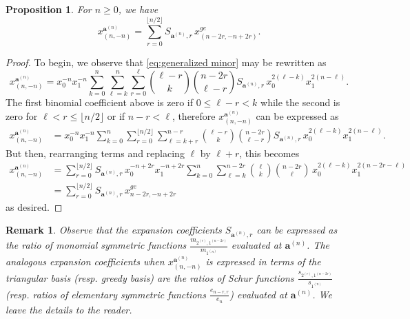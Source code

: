 \documentclass[pdflatex,sn-mathphys]{sn-jnl}%
\theoremstyle{thmstyleone}%
\newtheorem{proposition}[theorem]{Proposition}
\theoremstyle{thmstyletwo}%
\newtheorem{remark}[theorem]{Remark}%
\theoremstyle{thmstylethree}%
\newcommand{\bfa}{\boldsymbol{a}}
\begin{document}
  \begin{proposition}
    \label{prop:rewrite}
    For $n\ge0$, we have
    \[
      x_{(n,-n)}^{\bfa^{(n)}}
      =
      \sum_{r=0}^{\lfloor n/2 \rfloor}
      S_{\bfa^{(n)},r}
      \,
      x_{(n-2r,-n+2r)}^{ge}.
    \]
  \end{proposition}
  \begin{proof}
    To begin, we observe that \eqref{eq:generalized minor} may be rewritten as
    \[
      x_{(n,-n)}^{\bfa^{(n)}} = x_0^{-n} x_1^{-n} \sum_{k=0}^n \sum_{\ell=k}^n \sum_{r=0}^\ell {\ell-r\choose k} {n-2r\choose \ell-r} S_{\bfa^{(n)},r}  \, x_0^{2(\ell-k)} x_1^{2(n-\ell)}.
    \]
    The first binomial coefficient above is zero if $0 \le \ell-r < k$ while the second is zero for $\ell < r \le \lfloor n/2\rfloor$ or if $n-r < \ell$, therefore $x_{(n,-n)}^{\bfa^{(n)}}$ can be expressed as
    \begin{align*}
      x_{(n,-n)}^{\bfa^{(n)}}
      &=
      x_0^{-n} x_1^{-n} \sum_{k=0}^n \sum_{r=0}^{\lfloor n/2\rfloor} \sum_{\ell=k+r}^{n-r} {\ell-r\choose k} {n-2r\choose \ell-r} S_{\bfa^{(n)},r}  \, x_0^{2(\ell-k)} x_1^{2(n-\ell)}.
    \end{align*}
    But then, rearranging terms and replacing $\ell$ by $\ell+r$, this becomes
    \begin{align*}
      x_{(n,-n)}^{\bfa^{(n)}}
      &=
      \sum_{r=0}^{\lfloor n/2\rfloor} S_{\bfa^{(n)},r}\, x_0^{-n+2r} x_1^{-n+2r} \sum_{k=0}^n \sum_{\ell=k}^{n-2r} {\ell\choose k} {n-2r\choose \ell} \, x_0^{2(\ell-k)} x_1^{2(n-2r-\ell)}\\
      &=
      \sum_{r=0}^{\lfloor n/2\rfloor} S_{\bfa^{(n)},r}\, x_{n-2r,-n+2r}^{ge}
    \end{align*}
    as desired.
  \end{proof}

  \begin{remark}
    \label{rk:symmetric}
    Observe that the expansion coefficients $S_{\bfa^{(n)},r}$ can be expressed as the ratio of monomial symmetric functions $\frac{m_{2^{(r)},1^{(n-2r)}}}{m_{1^{(n)}}}$ evaluated at $\bfa^{(n)}$.
    The analogous expansion coefficients when $x_{(n,-n)}^{\bfa^{(n)}}$ is expressed in terms of the triangular basis (resp. greedy basis) are the ratios of Schur functions $\frac{s_{2^{(r)},1^{(n-2r)}}}{s_{1^{(n)}}}$ (resp. ratios of elementary symmetric functions $\frac{e_{n-r,r}}{e_n}$) evaluated at $\bfa^{(n)}$.
    We leave the details to the reader.
  \end{remark}
\end{document}
